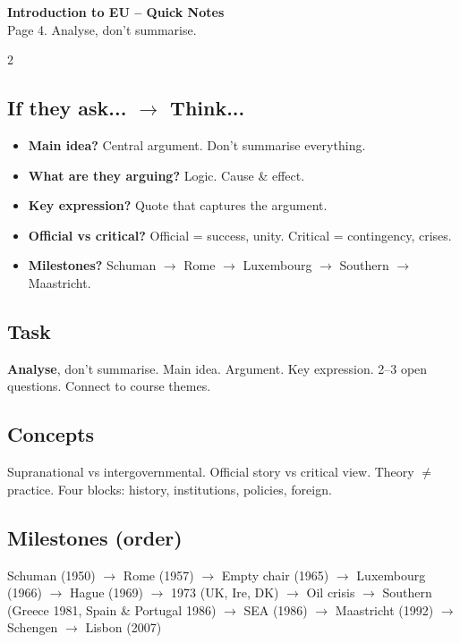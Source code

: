\documentclass[10pt,landscape,a4paper]{article}
\begin{document}
\newpage
\begin{center}
{\LARGE\bfseries\color{accent} Introduction to EU -- Quick Notes}\\[0.3em]
\small Page 4. Analyse, don't summarise.
\end{center}
\vspace{0.5em}
\begin{multicols}{2}
\subsection*{\color{accent} If they ask... $\to$ Think...}
\begin{itemize}[leftmargin=*,nosep]
\item \textbf{Main idea?} Central argument. Don't summarise everything.
\item \textbf{What are they arguing?} Logic. Cause \& effect.
\item \textbf{Key expression?} Quote that captures the argument.
\item \textbf{Official vs critical?} Official = success, unity. Critical = contingency, crises.
\item \textbf{Milestones?} Schuman $\to$ Rome $\to$ Luxembourg $\to$ Southern $\to$ Maastricht.
\end{itemize}

\subsection*{\color{accent} Task}
\textbf{Analyse}, don't summarise. Main idea. Argument. Key expression. 2--3 open questions. Connect to course themes.

\subsection*{\color{accent} Concepts}
Supranational vs intergovernmental. Official story vs critical view. Theory $\neq$ practice. Four blocks: history, institutions, policies, foreign.

\subsection*{\color{accent} Milestones (order)}
Schuman (1950) $\to$ Rome (1957) $\to$ Empty chair (1965) $\to$ Luxembourg (1966) $\to$ Hague (1969) $\to$ 1973 (UK, Ire, DK) $\to$ Oil crisis $\to$ Southern (Greece 1981, Spain \& Portugal 1986) $\to$ SEA (1986) $\to$ Maastricht (1992) $\to$ Schengen $\to$ Lisbon (2007)


\end{multicols}
\end{document}
